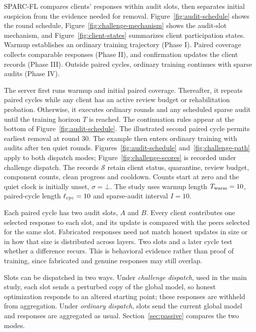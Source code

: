 \documentclass[journal]{IEEEtran}
\makeatletter
\renewcommand{\section}{\@startsection{section}{1}{\z@}{1.5ex}{0.7ex}{\normalfont\normalsize\centering\scshape}}
\makeatother
\begin{document}
\section{Proposed Methodology}\label{sec:method}
SPARC-FL compares clients' responses within audit slots, then separates
initial suspicion from the evidence needed for removal.
Figure~\ref{fig:audit-schedule} shows the round schedule,
Figure~\ref{fig:challenge-mechanism} shows the audit-slot mechanism, and
Figure~\ref{fig:client-states} summarizes client participation states.
Warmup establishes an ordinary training trajectory
(Phase I). Paired coverage collects comparable responses
(Phase II), and confirmation updates the client records
(Phase III). Outside paired cycles, ordinary training
continues with sparse audits (Phase IV).

The server first runs warmup and initial paired coverage. Thereafter, it
repeats paired cycles while any client has an active review budget or
rehabilitation probation. Otherwise, it executes ordinary rounds and any
scheduled sparse audit until the training horizon $T$ is reached. The
continuation rules appear at the bottom of Figure~\ref{fig:audit-schedule}.
The illustrated second paired cycle permits earliest removal at round 30.
The example then enters ordinary training with audits after ten quiet rounds.
Figures~\ref{fig:audit-schedule} and~\ref{fig:challenge-path} apply to both dispatch modes; Figure~\ref{fig:challenge-scores} is recorded under challenge dispatch.
The records $\mathcal S$ retain client status, quarantine, review budget,
component counts, clean progress and cooldown. Counts start at zero and
the quiet clock is initially unset, $\sigma=\bot$. The study uses warmup length
$T_{\rm warm}=10$, paired-cycle length $\ell_{\rm cyc}=10$ and sparse-audit interval $I=10$.

Each paired cycle has two audit slots, $A$ and $B$. Every client
contributes one selected response to each slot, and its update is
compared with the peers selected for the same slot. Fabricated responses
need not match honest updates in size or in how that size is distributed
across layers. Two slots and a later cycle test whether a difference
recurs. This is behavioral evidence rather than proof of training, since
fabricated and genuine responses may still overlap.

Slots can be dispatched in two ways. Under \emph{challenge dispatch}, used
in the main study, each slot sends a perturbed copy of the global model,
so honest optimization responds to an altered starting point; these
responses are withheld from aggregation. Under \emph{ordinary dispatch},
slots send the current global model and responses are aggregated as usual.
Section~\ref{sec:passive} compares the two modes.

\end{document}
